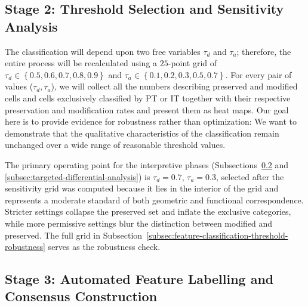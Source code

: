 \subsection{Stage 2: Threshold Selection and Sensitivity Analysis}
\label{subsec:threshold-selection}

The classification will depend upon two free variables $\tau_{d}$ and $\tau_{a}$; therefore, the entire process will be recalculated using a $25$-point grid of $\tau_{d}\in\left\{0.5,0.6,0.7,0.8,0.9\right\}$ and $\tau_{a}\in\left\{0.1,0.2,0.3,0.5,0.7\right\}$. For every pair of values ($\tau_{d},\tau_{a}$), we will collect all the numbers describing preserved and modified cells and cells exclusively classified by PT or IT together with their respective preservation and modification rates and present them as heat maps. Our goal here is to provide evidence for robustness rather than optimization: We want to demonstrate that the qualitative characteristics of the classification remain unchanged over a wide range of reasonable threshold values.

The primary operating point for the interpretive phases (Subsections~\ref{subsec:automated-labelling} and \ref{subsec:targeted-differential-analysis}) is $\tau_d=0.7$, $\tau_a=0.3$, selected after the sensitivity grid was computed because it lies in the interior of the grid and represents a moderate standard of both geometric and functional correspondence. Stricter settings collapse the preserved set and inflate the exclusive categories, while more permissive settings blur the distinction between modified and preserved. The full grid in Subsection~\ref{subsec:feature-classification-threshold-robustness} serves as the robustness check.

\subsection{Stage 3: Automated Feature Labelling and Consensus Construction}
\label{subsec:automated-labelling}

